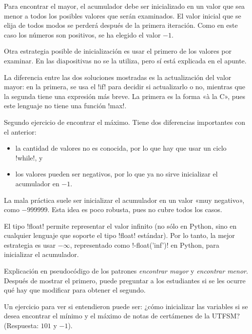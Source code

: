 \documentclass[10pt]{article}
\begin{document}
  Para encontrar el mayor,
  el acumulador debe ser inicializado en un valor que sea menor
  a todos los posibles valores que serán examinados.
  El valor inicial que se elija
  de todos modos se perderá después de la primera iteración.
  Como en este caso los números son positivos,
  se ha elegido el valor \(-1\).

  Otra estrategia posible de inicialización
  es usar el primero de los valores por examinar.
  En las diapositivas no se la utiliza,
  pero sí está explicada en el apunte.

  La diferencia entre las dos soluciones mostradas
  es la actualización del valor mayor:
  en la primera, se usa el \li!if! para decidir si actualizarlo o no,
  mientras que la segunda tiene una expresión más breve.
  La primera es la forma «à la C», pues este lenguaje no tiene una función \li!max!.


  Segundo ejercicio de encontrar el máximo.
  Tiene dos diferencias importantes con el anterior:
  \begin{itemize}
    \item la cantidad de valores no es conocida,
      por lo que hay que usar un ciclo \li!while!, y
    \item los valores pueden ser negativos,
      por lo que ya no sirve inicializar el acumulador en \(-1\).
  \end{itemize}

  La mala práctica suele ser inicializar el acumulador
  en un valor «muy negativo», como \(-999999\).
  Esta idea es poco robusta, pues no cubre todos los casos.
  
  El tipo \li!float! permite representar el valor infinito
  (no sólo en Python, sino en cualquier lenguaje que soporte el tipo \li!float! estándar).
  Por lo tanto,
  la mejor estrategia es usar \(-\infty\),
  representado como \li!-float('inf')! en Python,
  para inicializar el acumulador.
  

  Explicación en pseudocódigo de los patrones \emph{encontrar mayor} y \emph{encontrar menor}.
  Después de mostrar el primero,
  puede preguntar a los estudiantes si se les ocurre qué hay que modificar
  para obtener el segundo.
  
  Un ejercicio para ver si entendieron puede ser:
  ¿cómo inicializar las variables
  si se desea encontrar el mínimo y el máximo
  de notas de certámenes de la UTFSM?
  (Respuesta: \(101\) y \(-1\)).
\end{document}
